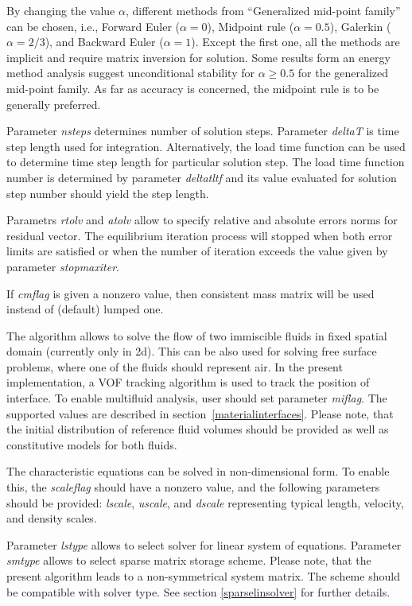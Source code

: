 \documentclass[draft]{article}
\newcommand{\param}[1]{{\em #1}}
\begin{document}
By changing the value $\alpha$, different methods from
``Generalized mid-point family'' can be chosen, i.e., 
Forward Euler ($\alpha=0$), Midpoint rule ($\alpha=0.5$),
 Galerkin ($\alpha=2/3$), and  Backward Euler ($\alpha=1$). Except
the first one, all the methods are implicit and require matrix inversion for solution. 
Some results form an energy method analysis suggest unconditional
stability for $\alpha\ge 0.5$ for the generalized mid-point family. As
far as accuracy is concerned, the midpoint rule is to be generally preferred. 

Parameter \param{nsteps} determines number of solution
steps. Parameter \param{deltaT} is time step length used for
integration. Alternatively, the load time function can be used to
determine time step length for particular solution step. The load time
function number is determined by parameter \param{deltatltf} and its
value evaluated for solution step number should yield the step length.

Parametrs \param{rtolv} and \param{atolv} allow to
specify relative and absolute errors norms for residual vector.
The equilibrium iteration process will stopped when both error limits
are satisfied or when the number of iteration exceeds the value given
by parameter \param{stopmaxiter}.

If \param{cmflag} is given a nonzero value, then
consistent mass matrix will be used instead of (default) lumped one.

The algorithm allows to solve the flow of two immiscible fluids in
fixed spatial domain (currently only in 2d). This can be also used for
solving free surface problems, where one of the fluids should
represent air. In the present implementation, a VOF tracking algorithm
is used to track the position of interface. To enable multifluid
analysis, user should set parameter \param{miflag}. The supported values are described in section~\ref{materialinterfaces}.
Please note, that the initial distribution of reference fluid
volumes should be provided as well as 
constitutive models for both fluids.


The characteristic equations can be solved in non-dimensional form. To
enable this, the \param{scaleflag} should have a nonzero value,
and the following parameters should be provided: \param{lscale},
\param{uscale}, and \param{dscale} representing typical length,
velocity, and density scales. 

Parameter \param{lstype} allows to select solver for linear system of
equations. Parameter \param{smtype} allows to select sparse matrix storage
scheme. Please note, that the present algorithm leads to a
non-symmetrical system
matrix. The scheme should be compatible with solver type. See section
\ref{sparselinsolver} for further details.
\end{document}
